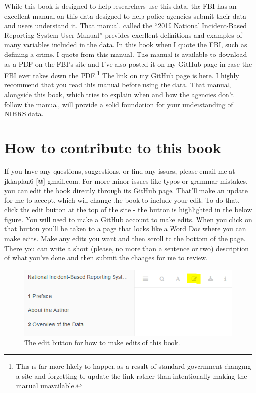 \documentclass[
  12pt,
  openany]{book}
\begin{document}
While this book is designed to help researchers use this data, the FBI has an excellent manual on this data designed to help police agencies submit their data and users understand it. That manual, called the ``2019 National Incident-Based Reporting System User Manual'' provides excellent definitions and examples of many variables included in the data. In this book when I quote the FBI, such as defining a crime, I quote from this manual. The manual is available to download as a PDF on the FBI's site and I've also posted it on my GitHub page in case the FBI ever takes down the PDF.\footnote{This is far more likely to happen as a result of standard government changing a site and forgetting to update the link rather than intentionally making the manual unavailable.} The link on my GitHub page is \href{https://github.com/jacobkap/nibrsbook/blob/main/2019-nibrs-user-manual-v-1.0.pdf}{here}. I highly recommend that you read this manual before using the data. That manual, alongside this book, which tries to explain when and how the agencies don't follow the manual, will provide a solid foundation for your understanding of NIBRS data.

\hypertarget{how-to-contribute-to-this-book}{%
\section{How to contribute to this book}\label{how-to-contribute-to-this-book}}

If you have any questions, suggestions, or find any issues, please email me at jkkaplan6 {[}@{]} gmail.com. For more minor issues like typos or grammar mistakes, you can edit the book directly through its GitHub page. That'll make an update for me to accept, which will change the book to include your edit. To do that, click the edit button at the top of the site - the button is highlighted in the below figure. You will need to make a GitHub account to make edits. When you click on that button you'll be taken to a page that looks like a Word Doc where you can make edits. Make any edits you want and then scroll to the bottom of the page. There you can write a short (please, no more than a sentence or two) description of what you've done and then submit the changes for me to review.

\begin{figure}

{\centering \includegraphics[width=0.9\linewidth]{images/edit_button} 

}

\caption{The edit button for how to make edits of this book.}\label{fig:unnamed-chunk-2}
\end{figure}
\end{document}
